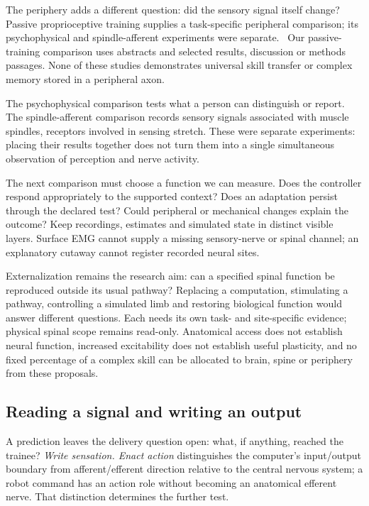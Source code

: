 The periphery adds a different question: did the sensory signal itself change?
Passive proprioceptive training supplies a task-specific peripheral comparison;
its psychophysical and spindle-afferent experiments were separate.~\cite{ackerley2022retained}
Our passive-training comparison uses abstracts and selected results, discussion
or methods passages. None of these studies demonstrates universal skill
transfer or complex memory stored in a peripheral axon.

The psychophysical comparison tests what a person can distinguish or report.
The spindle-afferent comparison records sensory signals associated with
muscle spindles, receptors involved in sensing stretch. These were separate
experiments: placing their results together does not turn them into a single
simultaneous observation of perception and nerve activity.

The next comparison must choose a function we can measure. Does the controller
respond appropriately to the supported context? Does an adaptation persist
through the declared test? Could peripheral or mechanical changes explain the
outcome? Keep recordings, estimates and simulated state in distinct visible
layers. Surface EMG cannot supply a missing sensory-nerve or spinal channel;
an explanatory cutaway cannot register recorded neural sites.

Externalization remains the research aim: can a specified spinal function be
reproduced outside its usual pathway? Replacing a computation, stimulating a
pathway, controlling a simulated limb and restoring biological function would
answer different questions. Each needs its own task- and site-specific evidence;
physical spinal scope remains read-only. Anatomical access does not establish
neural function, increased excitability does not establish useful plasticity,
and no fixed percentage of a complex skill can be allocated to brain, spine
or periphery from these proposals.

\subsection{Reading a signal and writing an output}

A prediction leaves the delivery question open: what, if anything, reached
the trainee? \emph{Write sensation. Enact action} distinguishes the computer's
input/output boundary from afferent/efferent direction relative to the central
nervous system; a robot command has an action role without becoming an
anatomical efferent nerve. That distinction determines the further test.

